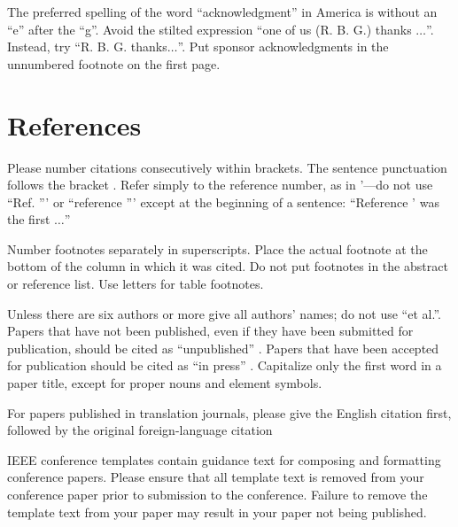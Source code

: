 \documentclass[conference]{IEEEtran}
\begin{document}
The preferred spelling of the word ``acknowledgment'' in America is without 
an ``e'' after the ``g''. Avoid the stilted expression ``one of us (R. B. 
G.) thanks $\ldots$''. Instead, try ``R. B. G. thanks$\ldots$''. Put sponsor 
acknowledgments in the unnumbered footnote on the first page.

\section{References}

Please number citations consecutively within brackets. The 
sentence punctuation follows the bracket . Refer simply to the reference 
number, as in  '---do not use ``Ref.  ''' or ``reference  ''' except at 
the beginning of a sentence: ``Reference  ' was the first $\ldots$''

Number footnotes separately in superscripts. Place the actual footnote at 
the bottom of the column in which it was cited. Do not put footnotes in the 
abstract or reference list. Use letters for table footnotes.

Unless there are six authors or more give all authors' names; do not use 
``et al.''. Papers that have not been published, even if they have been 
submitted for publication, should be cited as ``unpublished''   . Papers 
that have been accepted for publication should be cited as ``in press''  . 
Capitalize only the first word in a paper title, except for proper nouns and 
element symbols.

For papers published in translation journals, please give the English 
citation first, followed by the original foreign-language citation




\vspace{12pt}
\color{red}
IEEE conference templates contain guidance text for composing and formatting conference papers. Please ensure that all template text is removed from your conference paper prior to submission to the conference. Failure to remove the template text from your paper may result in your paper not being published.
\end{document}
